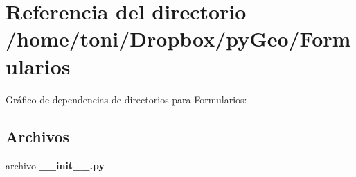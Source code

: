 \section{Referencia del directorio /home/toni/\-Dropbox/py\-Geo/\-Formularios}
\label{dir_0923afa793b6095096d51ae0d6da99eb}
Gráfico de dependencias de directorios para Formularios\-:
\subsection*{Archivos}
\begin{DoxyCompactItemize}
\item 
archivo {\bf \-\_\-\-\_\-init\-\_\-\-\_\-.\-py}
\end{DoxyCompactItemize}
